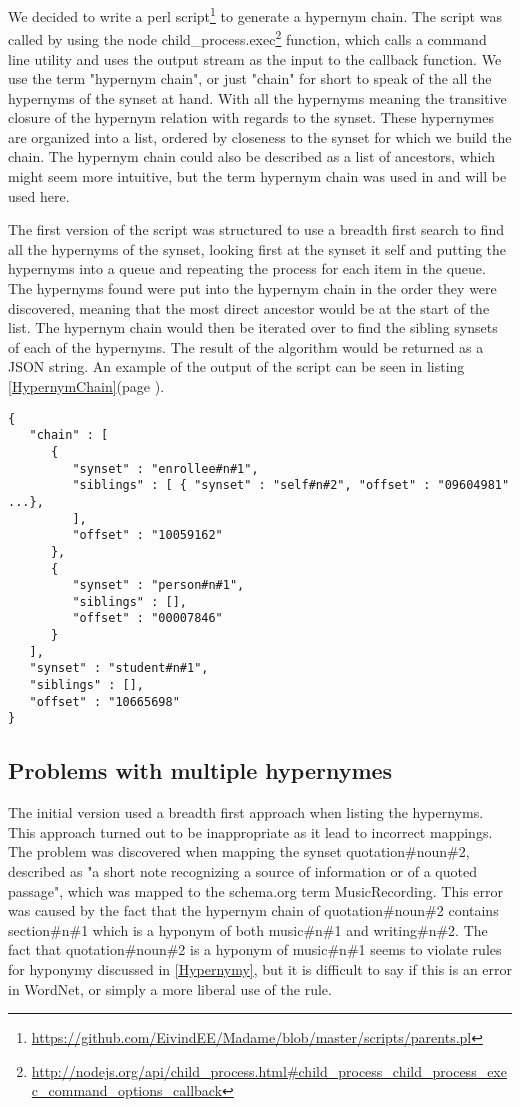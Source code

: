 We decided to write a perl script\footnote{\url{https://github.com/EivindEE/Madame/blob/master/scripts/parents.pl}} to generate a hypernym chain.
The script was called by using the node
child\_process.exec\footnote{\url{http://nodejs.org/api/child\_process.html\#child\_process\_child\_process\_exec\_command\_options\_callback}}
function, which calls a command line utility and uses the output stream as the input to the callback function.
We use the term "hypernym chain", or just "chain" for short to speak of the all the hypernyms of the synset at hand.
With all the hypernyms meaning  the transitive closure of the hypernym relation with regards to the synset.
These hypernymes are organized into a list, ordered by closeness to the synset for which we build the chain.
The hypernym chain could also be described as a list of ancestors,
which might seem more intuitive, but the term hypernym chain was used in \citet{Veres2011} and will be used here.

The first version of the script was structured to use a breadth first search to find all the hypernyms of the synset,
looking first at the synset it self and putting the hypernyms into a queue and repeating the process for each item in the queue.
The hypernyms found were put into the hypernym chain in the order they were discovered,
meaning that the most direct ancestor would be at the start of the list.
The hypernym chain would then be iterated over to find the sibling synsets of each of the hypernyms.
The result of the algorithm would be returned as a JSON string.
An example of the output of the script can be seen in listing \ref{HypernymChain}(page \pageref{HypernymChain}).

\begin{lstlisting}[label=HypernymChain, caption={Excerpt from the hypernym chain for student\#n\#1}]
{
   "chain" : [
      {
         "synset" : "enrollee#n#1",
         "siblings" : [ { "synset" : "self#n#2", "offset" : "09604981" ...},
         ],
         "offset" : "10059162"
      },
      {
         "synset" : "person#n#1",
         "siblings" : [],
         "offset" : "00007846"
      }
   ],
   "synset" : "student#n#1",
   "siblings" : [],
   "offset" : "10665698"
}
\end{lstlisting}

\subsection{Problems with multiple hypernymes}
The initial version used a breadth first approach when listing the hypernyms.
This approach turned out to be inappropriate as it lead to incorrect mappings.
The problem was discovered when mapping the synset quotation\#noun\#2,
described as "a short note recognizing a source of information or of a quoted passage",
which was mapped to the schema.org term MusicRecording.
This error was caused by the fact that the hypernym chain of quotation\#noun\#2 contains
section\#n\#1 which is a hyponym of both music\#n\#1 and writing\#n\#2.
The fact that quotation\#noun\#2 is a hyponym of music\#n\#1 seems to violate rules for hyponymy discussed in \ref{Hypernymy},
but it is difficult to say if this is an error in WordNet, or simply a more liberal use of the rule.

